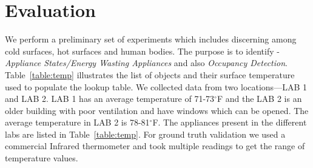 %


 \section{Evaluation}

    We perform a preliminary set of experiments which includes discerning among cold surfaces, hot surfaces and human bodies. The purpose is to identify - \textit{ Appliance States/Energy Wasting Appliances} and also \textit{ Occupancy Detection}. Table~\ref{table:temp} illustrates the list of objects and their surface temperature used to populate the lookup table. We collected data from two locations---LAB 1 and LAB 2. LAB 1 has an average temperature of 71-73$^{\circ}$F and the LAB 2 is an older building with poor ventilation and have windows which can be opened. The average temperature in LAB 2 is 78-81$^{\circ}$F. The appliances present in the different labs are listed in Table~\ref{table:temp}. For ground truth validation we used a commercial Infrared thermometer and took multiple readings to get the range of temperature values.
   

